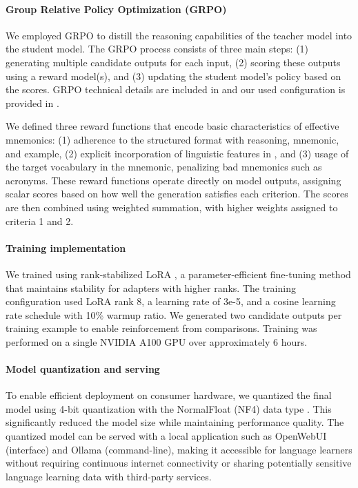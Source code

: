 \documentclass[11pt]{article}
\begin{document}
\paragraph{Group Relative Policy Optimization (GRPO)} We employed GRPO \citep{DeepSeek-AIDEEPSEEKR12025} to distill the reasoning capabilities of the teacher model into the student model. The GRPO process consists of three main steps: (1) generating multiple candidate outputs for each input, (2) scoring these outputs using a reward model(s), and (3) updating the student model's policy based on the scores. GRPO technical details are included in   and our used configuration is provided in .

We defined three reward functions that encode basic characteristics of effective mnemonics:
(1) adherence to the structured format with reasoning, mnemonic, and example,
(2) explicit incorporation of linguistic features in , and
(3) usage of the target vocabulary in the mnemonic,  penalizing bad mnemonics such as acronyms.
These reward functions operate directly on model outputs, assigning scalar scores based on how well the generation satisfies each criterion. The scores are then combined using weighted summation, with higher weights assigned to criteria 1 and 2.

\paragraph{Training implementation} We trained  using rank-stabilized LoRA \citep{kalajdzievskiRankStabilizationScaling2023}, a parameter-efficient fine-tuning method that maintains stability for adapters with higher ranks. The training configuration used LoRA rank 8, a learning rate of 3e-5, and a cosine learning rate schedule with 10\% warmup ratio. We generated two candidate outputs per training example to enable reinforcement from comparisons. Training was performed on a single NVIDIA A100 GPU over approximately 6 hours.

\paragraph{Model quantization and serving} To enable efficient deployment on consumer hardware, we quantized the final model using 4-bit quantization with the NormalFloat (NF4) data type \citep{dettmersQLoRAEfficientFinetuning2023}. This significantly reduced the model size while maintaining performance quality. The quantized model can be served with a local application such as OpenWebUI (interface) and Ollama (command-line), making it accessible for language learners without requiring continuous internet connectivity or sharing potentially sensitive language learning data with third-party services.
\end{document}
